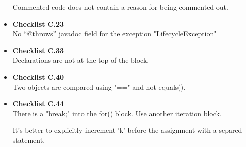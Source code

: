 \documentclass[../../../../codeInspection.tex]{subfiles}
\begin{document}
\begin{itemize}
		    	  

		    	  

		    	  

		    	  Commented code does not contain a reason for being commented out.

		    \item \textbf{Checklist C.23} \\

		          

		          No “@throws” javadoc field for the exception "LifecycleException"

		    \item \textbf{Checklist C.33} \\

		    	  

		    	  Declarations are not at the top of the block.

		    \item \textbf{Checklist C.40} \\

		          

		          Two objects are compared using "==" and not equals().

		    \item \textbf{Checklist C.44} \\

		          

		          There is a "break;" into the for() block. Use another iteration block.

		          

		          It's better to explicitly increment 'k' before the assignment with a separed statement.


\end{itemize}
\end{document}
